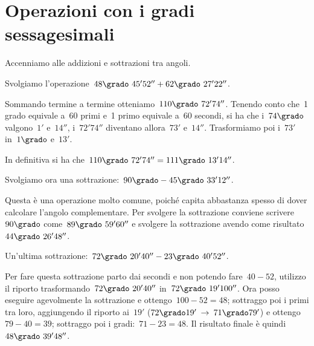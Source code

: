 \ovalbox{\risolvii \ref{ese:G.3}, \ref{ese:G.4}, \ref{ese:G.5}}

\section{Operazioni con i gradi sessagesimali}

Accenniamo alle addizioni e sottrazioni tra angoli.

\begin{exrig}
 \begin{esempio}
Svolgiamo l'operazione~$48\grado~45' 52'' + 62\grado~27' 22''$.
\begin{center}
 
\end{center}

Sommando termine a termine otteniamo~$110\grado~72' 74''$. Tenendo conto che~1 grado equivale a~60 primi e~1 primo equivale a~60 secondi,
si ha che i~$74\grado$ valgono~$1'$ e~$14''$, i~$72' 74''$ diventano allora~$73'$ e~$14''$.
Trasformiamo poi i~$73'$ in~$1\grado$ e~$13'$.

In definitiva si ha che~$110\grado~72' 74'' = 111\grado~13' 14''$.
 \end{esempio}

 \begin{esempio}
Svolgiamo ora una sottrazione:~$90\grado - 45\grado~33' 12''$.
\begin{center}
 
\end{center}

Questa è una operazione molto comune, poiché capita abbastanza spesso di dover calcolare l'angolo complementare.
Per svolgere la sottrazione conviene scrivere~$90\grado$ come~$89\grado~59' 60''$ e svolgere la sottrazione avendo come risultato~$44\grado~26' 48''$.
 \end{esempio}

 \begin{esempio}
Un'ultima sottrazione:~$72\grado~20' 40'' - 23\grado~40' 52''$.

Per fare questa sottrazione parto dai secondi e non potendo fare~$40-52$, utilizzo il riporto trasformando~$72\grado~20' 40''$
in~$72\grado~19' 100''$. Ora posso eseguire agevolmente la sottrazione e ottengo~$100-52=48$;
sottraggo poi i primi tra loro, aggiungendo il riporto ai~$19'$ ($72\grado 19' \:\rightarrow\: 71\grado 79'$) e ottengo~$79-40=39$; sottraggo poi i gradi:~$71-23=48$.
Il risultato finale è quindi~$48\grado~39' 48''$.
 \end{esempio}
\end{exrig}

